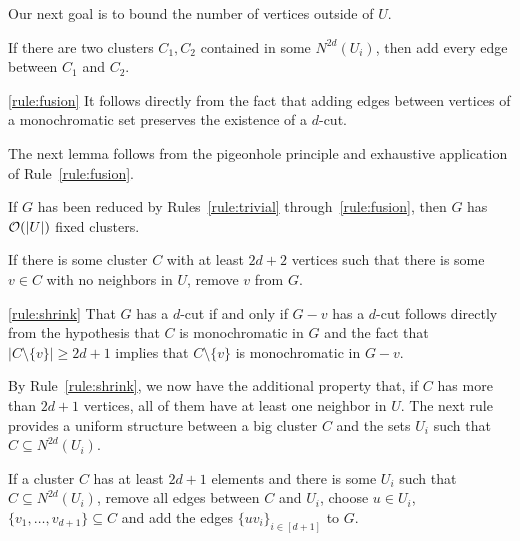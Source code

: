 Our next goal is to bound the number of vertices outside of $U$.

\begin{rrule}
    \label{rule:fusion}
    If there are two clusters $C_1, C_2$ contained in some $N^{2d}(U_i)$, then add every edge between $C_1$ and $C_2$.
\end{rrule}

\begin{sproof}{\ref{rule:fusion}}
    It follows directly from the fact that adding edges between vertices of a monochromatic set preserves the existence of a $d$-cut.
\end{sproof}

The next lemma follows from the pigeonhole principle and exhaustive application of Rule~\ref{rule:fusion}.

\begin{lemma}
    \label{lem:fixed_clusters}
    If $G$ has been reduced by Rules~\ref{rule:trivial} through~\ref{rule:fusion}, then $G$ has $\mathcal{O}\!\left(|U|\right)$ fixed clusters.
\end{lemma}

\begin{rrule}
    \label{rule:shrink}
    If there is some cluster $C$ with at least $2d+2$ vertices such that there is some $v \in C$ with no neighbors in $U$, remove $v$ from $G$.
\end{rrule}

\begin{sproof}{\ref{rule:shrink}}
    That $G$ has a $d$-cut if and only if $G - v$ has a $d$-cut follows directly from the hypothesis that $C$ is monochromatic in $G$ and the fact that $|C \setminus \{v\}| \geq 2d + 1$ implies that $C \setminus \{v\}$ is monochromatic in $G - v$.
\end{sproof}

By Rule~\ref{rule:shrink}, we now have the additional property that, if $C$ has more than $2d+1$ vertices, all of them have at least one neighbor in $U$. The next rule provides a uniform structure between a big cluster $C$ and the sets $U_i$ such that $C \subseteq N^{2d}(U_i)$.

\begin{rrule}
    \label{rule:normalization1}
    If a cluster $C$ has at least $2d+1$ elements and there is some $U_i$ such that $C \subseteq N^{2d}(U_i)$, remove all edges between $C$ and $U_i$, choose $u \in U_i$, $\{v_1, \dots, v_{d+1}\} \subseteq C$ and add the edges $\{uv_i\}_{i \in [d+1]}$ to $G$.
\end{rrule}

